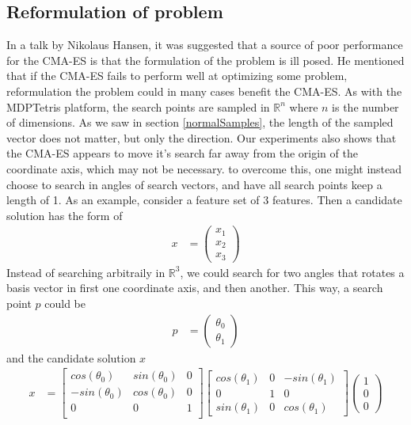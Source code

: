 \subsection{Reformulation of problem}

In a talk by Nikolaus Hansen, it was suggested that a source of poor performance 
for the CMA-ES is that the formulation of the problem is ill posed.
He mentioned that if the CMA-ES fails to perform well at optimizing some problem,
reformulation the problem could in many cases benefit the CMA-ES. As with the 
MDPTetris platform, the search points are sampled in $\mathbb{R}^n$ where 
$n$ is the number of dimensions. As we saw in section \ref{normalSamples}, the length 
of the sampled vector does not matter, but only the direction. Our experiments also shows that 
the CMA-ES appears to move it's search far away from the origin of the coordinate axis,
which may not be necessary. to overcome this, one might instead choose to search in angles 
of search vectors, and have all search points keep a length of 1. As an example, 
consider a feature set of 3 features. Then a candidate solution has the form of
\begin{align}
x &= \begin{pmatrix}
x_1 \\
x_2 \\
x_3
\end{pmatrix}
\end{align}
Instead of searching arbitraily in $\mathbb{R}^3$, we could search for two angles that rotates
a basis vector in first one coordinate axis, and then another. This way, a search point $p$ 
could be
\begin{align}
p &= \begin{pmatrix}
\theta_0\\
\theta_1
\end{pmatrix}
\end{align}
and the candidate solution $x$
\begin{align}
x &= 
\begin{bmatrix}
cos\left( \theta_0 \right) & sin\left( \theta_0 \right) & 0\\
-sin\left( \theta_0 \right) & cos\left( \theta_0 \right) & 0\\
0 & 0 & 1\\
\end{bmatrix}
\begin{bmatrix}
cos\left( \theta_1 \right) & 0 & -sin\left( \theta_1 \right)\\
0 & 1 & 0\\
sin\left( \theta_1 \right) & 0 & cos\left( \theta_1 \right)
\end{bmatrix}
\begin{pmatrix}
1\\
0\\
0
\end{pmatrix}
\end{align}
